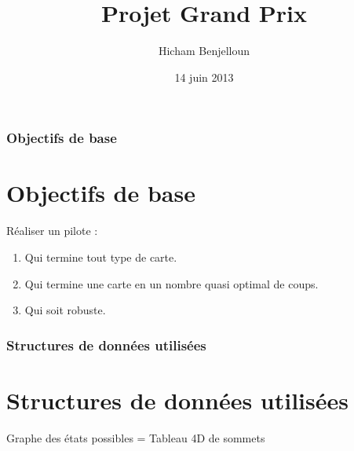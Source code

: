 \documentclass[c]{beamer}
\title{Projet Grand Prix}
\author{Hicham Benjelloun}
\institute{ENSICAEN}
\date{14 juin 2013}
\begin{document}

\begin{frame}
\transdissolve[duration=1]
\titlepage
\end{frame}

\begin{frame}
\transdissolve[duration=1]
  \tableofcontents
\end{frame}


\begin{frame}[label=objectifs]
\transdissolve[duration=1]
\frametitle{Objectifs de base}
\section{Objectifs de base}
Réaliser un pilote :

\begin{enumerate}
\item Qui termine tout type de carte.
\item Qui termine une carte en un nombre quasi optimal de coups.
\item Qui soit robuste.
\end{enumerate}
\end{frame}

\begin{frame}[label=structures]
\transdissolve[duration=1]
\frametitle{Structures de données utilisées}
\section{Structures de données utilisées}
Graphe des états possibles = Tableau 4D de sommets
\end{frame}
\end{document}
